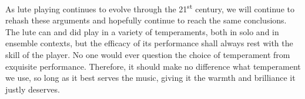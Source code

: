 As lute playing continues to evolve through the 21\textsuperscript{st} century, we will
continue to rehash these arguments and hopefully continue to reach the same
conclusions. The lute can and did play in a variety of temperaments, both in solo and
in ensemble contexts, but the efficacy of its performance shall always rest with the
skill of the player. No one would ever question the choice of temperament from
exquisite performance. Therefore, it should make no difference what temperament we use,
so long as it best serves the music, giving it the warmth and brilliance it justly
deserves.
